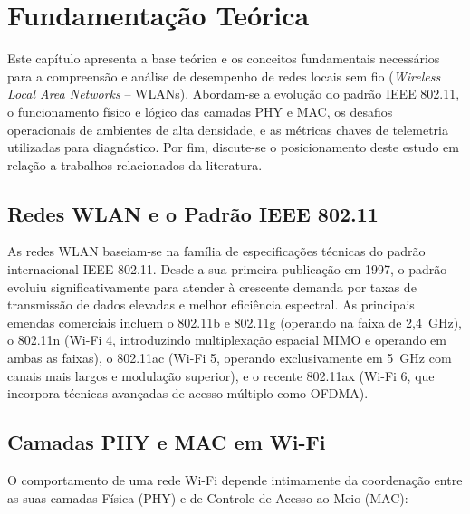 \chapter{Fundamentação Teórica}
\label{cap:revisao}

Este capítulo apresenta a base teórica e os conceitos fundamentais necessários para a compreensão e análise de desempenho de redes locais sem fio (\textit{Wireless Local Area Networks} -- WLANs). Abordam-se a evolução do padrão IEEE 802.11, o funcionamento físico e lógico das camadas PHY e MAC, os desafios operacionais de ambientes de alta densidade, e as métricas chaves de telemetria utilizadas para diagnóstico. Por fim, discute-se o posicionamento deste estudo em relação a trabalhos relacionados da literatura.

\section{Redes WLAN e o Padrão IEEE 802.11}
\label{sec:fundamentacao_wlan}

As redes WLAN baseiam-se na família de especificações técnicas do padrão internacional IEEE 802.11. Desde a sua primeira publicação em 1997, o padrão evoluiu significativamente para atender à crescente demanda por taxas de transmissão de dados elevadas e melhor eficiência espectral. As principais emendas comerciais incluem o 802.11b e 802.11g (operando na faixa de 2,4~GHz), o 802.11n (Wi-Fi 4, introduzindo multiplexação espacial MIMO e operando em ambas as faixas), o 802.11ac (Wi-Fi 5, operando exclusivamente em 5~GHz com canais mais largos e modulação superior), e o recente 802.11ax (Wi-Fi 6, que incorpora técnicas avançadas de acesso múltiplo como OFDMA).

\section{Camadas PHY e MAC em Wi-Fi}
\label{sec:fundamentacao_camadas}

O comportamento de uma rede Wi-Fi depende intimamente da coordenação entre as suas camadas Física (PHY) e de Controle de Acesso ao Meio (MAC):

